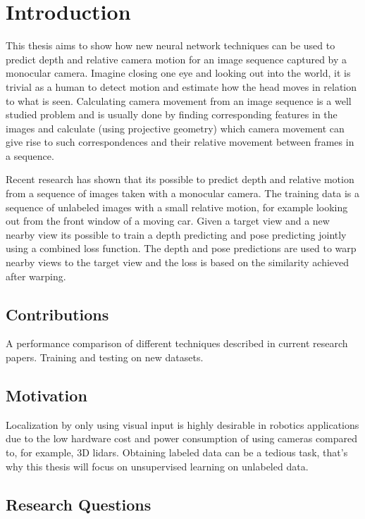 \chapter{Introduction}\label{cha:intro}

This thesis aims to show how new neural network techniques can be used to predict depth and relative camera motion for an image sequence captured by a monocular \abbrRGB camera. Imagine closing one eye and looking out into the world, it is trivial as a human to detect motion and estimate how the head moves in relation to what is seen. Calculating camera movement from an image sequence is a well studied problem and is usually done by finding corresponding features in the images and calculate (using projective geometry) which camera movement can give rise to such correspondences and their relative movement between frames in a sequence.

Recent research has shown that its possible to predict depth and relative motion from a sequence of images taken with a monocular \abbrRGB camera. The training data is a sequence of unlabeled images with a small relative motion, for example looking out from the front window of a moving car. Given a target view and a new nearby view its possible to train a depth predicting and pose predicting \abbrCNN jointly using a combined loss function. The depth and pose predictions are used to warp nearby views to the target view and the loss is based on the similarity achieved after warping.

\section{Contributions}

A performance comparison of different techniques described in current research papers. Training and testing on new datasets.

\section{Motivation}

Localization by only using visual input is highly desirable in robotics applications due to the low hardware cost and power consumption of using cameras compared to, for example, 3D lidars. Obtaining labeled data can be a tedious task, that's why this thesis will focus on unsupervised learning on unlabeled data.

\section{Research Questions}

